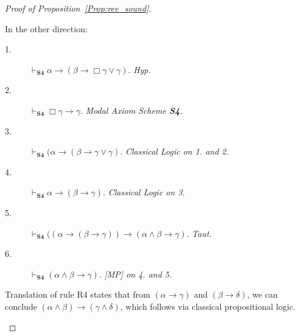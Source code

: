 \documentclass[a4paper]{article}
\newcommand{\SFour}{\textbf{S4}\xspace}
\begin{document}
\begin{proof}[Proof of Proposition~\ref{Prop:rev_sound}]
\begin{description}
\begin{description}
\end{description}
In the other direction:
\begin{description}
    \item[1.] $\vdash_{\SFour}\alpha \rightarrow(\beta\rightarrow\Box \gamma \lor \gamma)$. \textit{ Hyp.}
    \item[2.] $\vdash_{\SFour}\Box \gamma \rightarrow \gamma$. \textit{ Modal Axiom Scheme \SFour.}
    \item[3.] $\vdash_{\SFour}(\alpha \rightarrow(\beta\rightarrow\gamma \lor \gamma).$ \textit{Classical Logic on 1. and 2.}
    \item[4.] $\vdash_{\SFour}\alpha \rightarrow(\beta\rightarrow \gamma).$ \textit{Classical Logic on 3.}
    \item[5.] $\vdash_{\SFour}((\alpha \rightarrow (\beta \rightarrow \gamma)) \rightarrow (\alpha \land \beta \rightarrow \gamma)$. \textit{Taut.}
    \item[6.] $\vdash_{\SFour}(\alpha \land \beta \rightarrow \gamma).$ \textit{[MP] on 4. and 5.}
\end{description}

    \item[3.] Translation of rule R4 states that from $(\alpha \rightarrow \gamma)$ and $(\beta \rightarrow \delta)$, we can conclude $( \alpha \land \beta)\rightarrow (\gamma \land \delta)$, which follows via classical propositional logic.

\end{description}
    

\end{proof}
\end{document}
